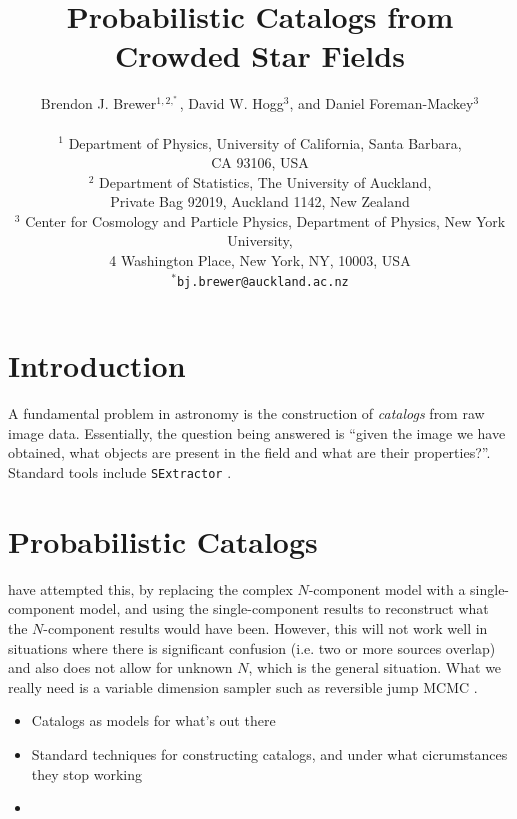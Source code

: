 \documentclass[letterpaper, 11pt]{article}
\title{Probabilistic Catalogs from Crowded Star Fields}
\author{Brendon J. Brewer$^{1, 2, ^*}$, David W. Hogg$^{3}$,
and Daniel Foreman-Mackey$^{3}$ \\
\\
\small
$^1$ Department of Physics, University of California, Santa Barbara,\\
\small
CA 93106, USA \\
\small
$^2$ Department of Statistics, The University of Auckland,\\
\small
Private Bag 92019, Auckland 1142, New Zealand \\
\small
$^3$ Center for Cosmology and Particle Physics, Department of Physics,
New York University,\\
\small
4 Washington Place, New York, NY, 10003, USA\\
\small
$^*$\texttt{bj.brewer@auckland.ac.nz}
}
\begin{document}
\maketitle

\section{Introduction}

A fundamental problem in astronomy is the construction of {\it catalogs} from
raw image data. Essentially, the question being answered is ``given the image
we have obtained, what objects are present in the field and what are their
properties?''. Standard tools include \texttt{SExtractor} \citep{sextractor}.

\section{Probabilistic Catalogs}


\citet{2011MNRAS.415.3462F} have attempted this, by replacing the complex
$N$-component model with a single-component model, and using the
single-component
results to reconstruct what the $N$-component results would have been. However,
this will not work well in situations where there is significant confusion
(i.e. two or more sources overlap) and also does not allow for unknown $N$,
which is the general situation. What we really need is a variable dimension
sampler such as reversible jump MCMC \citep{rjmcmc}.

\begin{itemize}
\item Catalogs as models for what's out there \\
\item Standard techniques for constructing catalogs, and under what
cicrumstances they stop working \\
\item 
\end{itemize}
\end{document}
